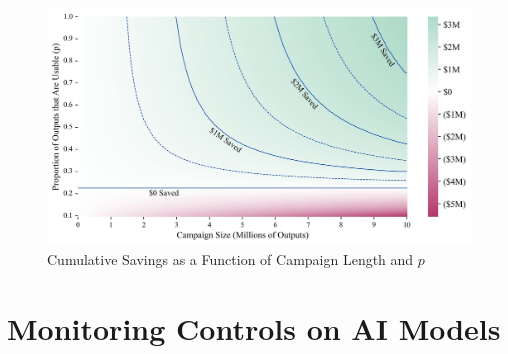 \documentclass{article}
\begin{document}
\begin{figure}[h]
  \centering
  \includegraphics[width=\textwidth]{figures/cumulative_savings_edited.jpg}
  \caption{Cumulative Savings as a Function of Campaign Length and $p$}
  \label{fig:cumulative}
\end{figure}

\section{Monitoring Controls on AI Models}
\label{sec:controls}
\end{document}
